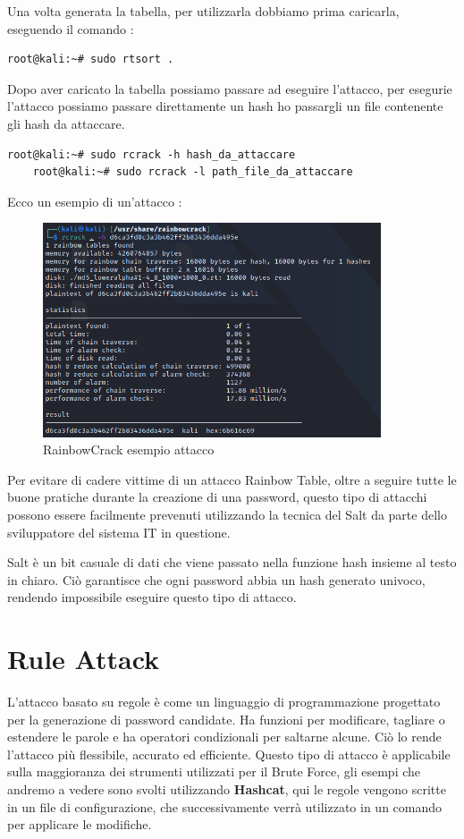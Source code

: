 Una volta generata la tabella, per utilizzarla dobbiamo prima caricarla, eseguendo il comando : 

\begin{lstlisting}[caption={RainbowCrack generazione tabelle}, style=javaScriptCode]
    root@kali:~# sudo rtsort .
    \end{lstlisting}

Dopo aver caricato la tabella possiamo passare ad eseguire l'attacco, per esegurie l'attacco possiamo passare direttamente un hash ho passargli un file contenente gli hash da attaccare.

\begin{lstlisting}[caption={RainbowCrack generazione tabelle}, style=javaScriptCode]
    root@kali:~# sudo rcrack -h hash_da_attaccare
    root@kali:~# sudo rcrack -l path_file_da_attaccare
    \end{lstlisting}
\newpage
Ecco un esempio di un'attacco :

\begin{figure}[h!]
    \centering
    \includegraphics[width=100mm]{Immagini/1/r_2.png}
    \caption{RainbowCrack esempio attacco}
\end{figure}

Per evitare di cadere vittime di un attacco Rainbow Table, oltre a seguire tutte le buone pratiche durante la creazione di una password, questo tipo di attacchi possono essere facilmente prevenuti utilizzando la tecnica del Salt da parte dello sviluppatore del sistema IT in questione. 

Salt è un bit casuale di dati che viene passato nella funzione hash insieme al testo in chiaro. Ciò garantisce che ogni password abbia un hash generato univoco, rendendo impossibile eseguire questo tipo di attacco.

\section{Rule Attack}
L'attacco basato su regole\cite{Rule_based} è come un linguaggio di programmazione progettato per la generazione di password candidate. Ha funzioni per modificare, tagliare o estendere le parole e ha operatori condizionali per saltarne alcune. Ciò lo rende l'attacco più flessibile, accurato ed efficiente.
Questo tipo di attacco è applicabile sulla maggioranza dei strumenti utilizzati per il Brute Force, gli esempi che andremo a vedere sono svolti utilizzando \textbf{Hashcat}, qui le regole vengono scritte in un file di configurazione, che successivamente verrà utilizzato in un comando per applicare le modifiche.

